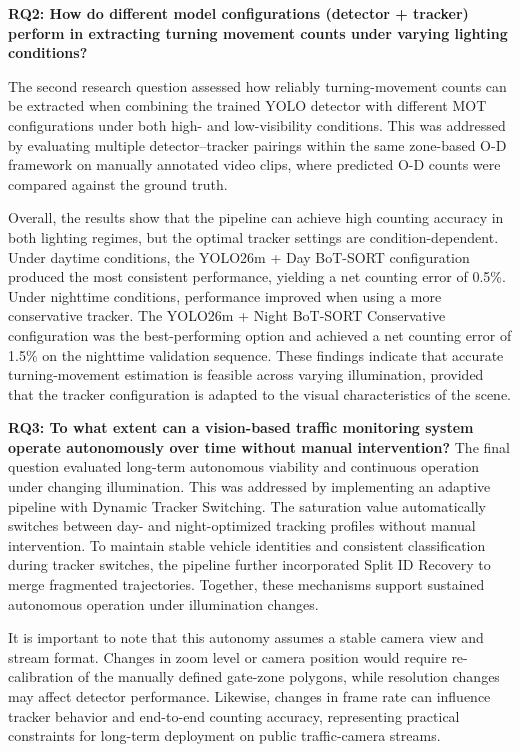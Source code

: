 \textbf{RQ2: How do different model configurations (detector + tracker) perform in extracting turning movement counts under varying lighting conditions?}

The second research question assessed how reliably turning-movement counts can be extracted when combining the trained YOLO detector with different MOT configurations under both high- and low-visibility conditions. This was addressed by evaluating multiple detector--tracker pairings within the same zone-based O-D framework on manually annotated video clips, where predicted O-D counts were compared against the ground truth.

Overall, the results show that the pipeline can achieve high counting accuracy in both lighting regimes, but the optimal tracker settings are condition-dependent. Under daytime conditions, the YOLO26m + Day BoT-SORT configuration produced the most consistent performance, yielding a net counting error of 0.5\%. Under nighttime conditions, performance improved when using a more conservative tracker. The YOLO26m + Night BoT-SORT Conservative configuration was the best-performing option and achieved a net counting error of 1.5\% on the nighttime validation sequence. These findings indicate that accurate turning-movement estimation is feasible across varying illumination, provided that the tracker configuration is adapted to the visual characteristics of the scene.

\textbf{RQ3: To what extent can a vision-based traffic monitoring system operate autonomously over time without manual intervention?}
The final question evaluated long-term autonomous viability and continuous operation under changing illumination. This was addressed by implementing an adaptive pipeline with Dynamic Tracker Switching. The saturation value automatically switches between day- and night-optimized tracking profiles without manual intervention. To maintain stable vehicle identities and consistent classification during tracker switches, the pipeline further incorporated Split ID Recovery to merge fragmented trajectories. Together, these mechanisms support sustained autonomous operation under illumination changes.

It is important to note that this autonomy assumes a stable camera view and stream format. Changes in zoom level or camera position would require re-calibration of the manually defined gate-zone polygons, while resolution changes may affect detector performance. Likewise, changes in frame rate can influence tracker behavior and end-to-end counting accuracy, representing practical constraints for long-term deployment on public traffic-camera streams.

